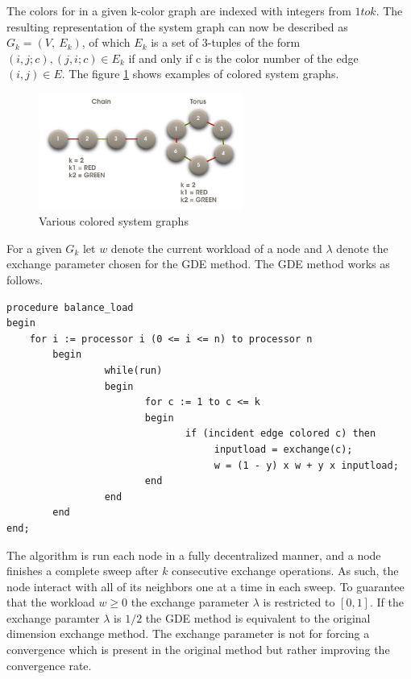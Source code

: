 \documentclass[DIV10, abstracton, openright, footsepline, headsepline, twoside, 9pt,
bigheadings]{scrreprt}
\begin{document}
The colors for in a given k-color graph are indexed with integers from $1 to k$.
The resulting representation of the system graph can now be described as
$G_k = (V,\ E_k)$, of which $E_k$ is a set of 3-tuples of the form
$(i, j; c), (j, i; c) \in E_k$ if and only if c is the color number of the edge
$(i, j) \in E$. The figure \ref{fig:colored_graphs} shows examples of colored
system graphs.

\begin{figure}[H]
\centering
\includegraphics[width=0.6\textwidth]{diagramme/colored_system_graphs}
\caption{Various colored system graphs}
\label{fig:colored_graphs}
\end{figure}

For a given $G_k$ let $w$ denote the current workload of a
node and $\lambda$ denote the exchange parameter chosen for the GDE method. The GDE
method works as follows.

\begin{lstlisting}[caption=Pseudo code for the Generalized Dimension Exchange method]
procedure balance_load
begin
	for i := processor i (0 <= i <= n) to processor n
        begin
                 while(run)
                 begin
                        for c := 1 to c <= k
                        begin
                               if (incident edge colored c) then
                                    inputload = exchange(c);
                                    w = (1 - y) x w + y x inputload;
                        end
                 end
        end
end;
\end{lstlisting}

The algorithm is run each node in a fully decentralized manner, and a node finishes
a complete sweep after $k$ consecutive exchange operations. As such, the node
interact with all of its neighbors one at a time in each sweep. To guarantee that
the workload $w \geq 0$ the exchange parameter $\lambda$ is restricted to $[0,1]$.
If the exchange paramter $\lambda$ is $1/2$ the GDE method is equivalent to the
original dimension exchange method. The exchange parameter is not for forcing a
convergence which is present in the original method but rather improving the
convergence rate.
\end{document}

